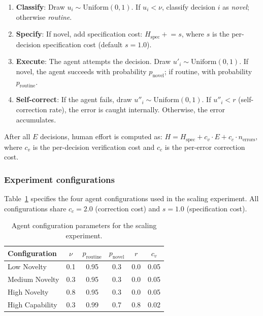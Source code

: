 \documentclass[11pt,a4paper]{article}
\begin{document}
\begin{enumerate}
\item \textbf{Classify}: Draw $u_i \sim \text{Uniform}(0,1)$. If $u_i < \nu$, classify decision $i$ as \emph{novel}; otherwise \emph{routine}.
\item \textbf{Specify}: If novel, add specification cost: $H_{\text{spec}} \mathrel{+}= s$, where $s$ is the per-decision specification cost (default $s = 1.0$).
\item \textbf{Execute}: The agent attempts the decision. Draw $u'_i \sim \text{Uniform}(0,1)$. If novel, the agent succeeds with probability $p_{\text{novel}}$; if routine, with probability $p_{\text{routine}}$.
\item \textbf{Self-correct}: If the agent fails, draw $u''_i \sim \text{Uniform}(0,1)$. If $u''_i < r$ (self-correction rate), the error is caught internally. Otherwise, the error accumulates.
\end{enumerate}

After all $E$ decisions, human effort is computed as:
$H = H_{\text{spec}} + c_v \cdot E + c_c \cdot n_{\text{errors}},$
where $c_v$ is the per-decision verification cost and $c_c$ is the per-error correction cost.

\subsubsection*{Experiment configurations}

Table~\ref{tab:configs} specifies the four agent configurations used in the scaling experiment. All configurations share $c_c = 2.0$ (correction cost) and $s = 1.0$ (specification cost).

\begin{table}[h]
\centering
\caption{Agent configuration parameters for the scaling experiment.}
\begin{tabular}{lccccc}
\toprule
Configuration & $\nu$ & $p_{\text{routine}}$ & $p_{\text{novel}}$ & $r$ & $c_v$ \\
\midrule
Low Novelty & 0.1 & 0.95 & 0.3 & 0.0 & 0.05 \\
Medium Novelty & 0.3 & 0.95 & 0.3 & 0.0 & 0.05 \\
High Novelty & 0.8 & 0.95 & 0.3 & 0.0 & 0.05 \\
High Capability & 0.3 & 0.99 & 0.7 & 0.8 & 0.02 \\
\bottomrule
\end{tabular}
\label{tab:configs}
\end{table}
\end{document}
